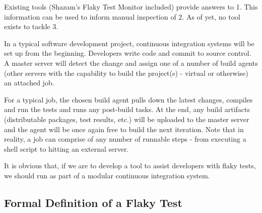 Existing tools (Shazam’s Flaky Test Monitor included) provide answers to 1. This information can be used to inform manual inspection of 2. As of yet, no tool exists to tackle 3.

In a typical software development project, continuous integration systems will be set up from the beginning. Developers write code and commit to source control. A master server will detect the change and assign one of a number of build agents (other servers with the capability to build the project(s) - virtual or otherwise) an attached job.

For a typical job, the chosen build agent pulls down the latest changes, compiles and run the tests and runs any post-build tasks. At the end, any build artifacts (distributable packages, test results, etc.) will be uploaded to the master server and the agent will be once again free to build the next iteration. Note that in reality, a job can comprise of any number of runnable steps - from executing a shell script to hitting an external server.


It is obvious that, if we are to develop a tool to assist developers with flaky tests, we should run as part of a modular continuous integration system.


\subsection{Formal Definition of a Flaky Test}

\theoremstyle{definition}
\newtheorem{defn}{Definition}[section]


